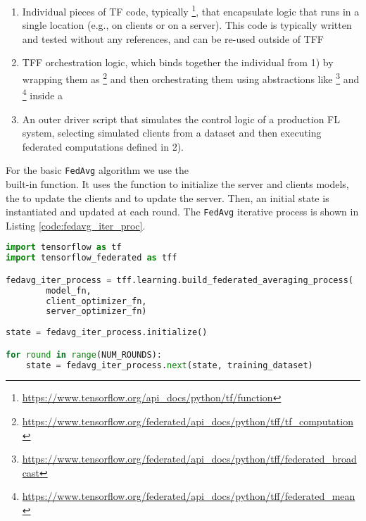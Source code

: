\begin{enumerate}
    \item Individual pieces of TF  code, typically \footnote{\url{https://www.tensorflow.org/api_docs/python/tf/function}}, that encapsulate logic that runs in a single location (e.g., on clients or on a server). This code is typically written and tested without any  references, and can be re-used outside of TFF
    
    \item TFF orchestration logic, which binds together the individual  from 1) by wrapping them as \footnote{\url{https://www.tensorflow.org/federated/api_docs/python/tff/tf_computation}} and then orchestrating them using abstractions like \footnote{\url{https://www.tensorflow.org/federated/api_docs/python/tff/federated_broadcast}} and \footnote{\url{https://www.tensorflow.org/federated/api_docs/python/tff/federated_mean}} inside a 
    
    \item An outer driver script that simulates the control logic of a production FL system, selecting simulated clients from a dataset and then executing federated computations defined in 2).
\end{enumerate}


For the basic \texttt{FedAvg} algorithm we use the \\  built-in function. It uses the  function to initialize the server and clients models, the  to update the clients and  to update the server. Then, an initial state is instantiated and updated at each round. The \texttt{FedAvg} iterative process is shown in Listing \ref{code:fedavg_iter_proc}. \\


\begin{lstlisting}[caption={Example code of the TFF iterative process for \texttt{FedAvg}.},label={code:fedavg_iter_proc},language=Python]
import tensorflow as tf
import tensorflow_federated as tff

fedavg_iter_process = tff.learning.build_federated_averaging_process(
        model_fn,
        client_optimizer_fn,
        server_optimizer_fn)
        
state = fedavg_iter_process.initialize()

for round in range(NUM_ROUNDS):
    state = fedavg_iter_process.next(state, training_dataset)
\end{lstlisting}


